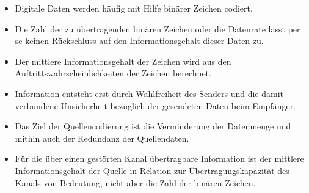 \begin{itemize}
  \item Digitale Daten werden häufig mit Hilfe binärer Zeichen codiert.
  \item Die Zahl der zu übertragenden binären Zeichen oder die Datenrate lässt per se keinen Rückschluss auf den Informationsgehalt dieser Daten zu.
  \item Der mittlere Informationsgehalt der Zeichen wird aus den Auftrittswahrscheinlichkeiten der Zeichen berechnet.
  \item Information entsteht erst durch Wahlfreiheit des Senders und die damit verbundene Unsicherheit bezüglich der gesendeten Daten beim Empfänger.
  \item Das Ziel der Quellencodierung ist die Verminderung der Datenmenge und mithin auch der Redundanz der Quellendaten.
  \item Für die über einen gestörten Kanal übertragbare Information ist der mittlere Informationsgehalt der Quelle in Relation zur Übertragungskapazität des Kanals von Bedeutung, nicht aber die Zahl der binären Zeichen.
\end{itemize}
